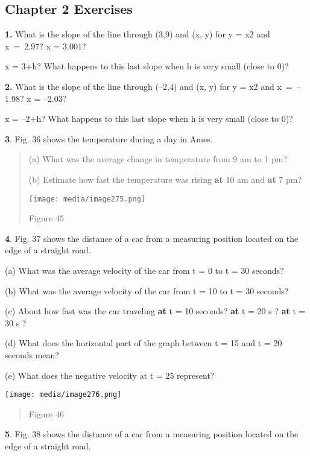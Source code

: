 \hypertarget{chapter-2-exercises}{\subsection{Chapter 2
Exercises}\label{chapter-2-exercises}}

\textbf{1.} What is the slope of the line through (3,9) and (x, y) for y
= x2 and x~=~2.97? x = 3.001?

x = 3+h? What happens to this last slope when h is very small (close to
0)?

\textbf{2.} What is the slope of the line through (--2,4) and (x, y) for
y = x2 and x~=~--1.98? x = --2.03?

x = --2+h? What happens to this last slope when h is very small (close
to 0)?

\textbf{3}. Fig. 36 shows the temperature during a day in Ames.

\begin{quote}
(a) What was the average change in temperature from 9 am to 1 pm?

(b) Estimate how fast the temperature was rising \textbf{at} 10 am and
\textbf{at} 7 pm?

\texttt{[image: media/image275.png]}

Figure 45
\end{quote}

\textbf{4}. Fig. 37 shows the distance of a car from a measuring
position located on the edge of a straight road.

(a) What was the average velocity of the car from t = 0 to t = 30
seconds?

(b) What was the average velocity of the car from t = 10 to t = 30
seconds?

(c) About how fast was the car traveling \textbf{at} t = 10 seconds?
\textbf{at} t = 20 s ? \textbf{at} t = 30 s ?

(d) What does the horizontal part of the graph between t = 15 and t = 20
seconds mean?

(e) What does the negative velocity at t = 25 represent?

\texttt{[image: media/image276.png]}

\begin{quote}
Figure 46
\end{quote}

\textbf{5}. Fig. 38 shows the distance of a car from a measuring
position located on the edge of a straight road.

